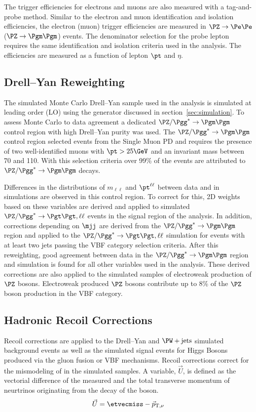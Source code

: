 The trigger efficiencies for electrons and muons are also measured with a tag-and-probe method.
Similar to the electron and muon identification and isolation efficiencies, the 
electron (muon) trigger efficiencies are measured in $\PZ\to\Pe\Pe$ ($\PZ\to\Pgm\Pgm$) events.
The denominator selection for the probe lepton requires the same identification and
isolation criteria used in the analysis. The efficiencies are measured as a function of
lepton $\pt$ and $\eta$.



\subsection{Drell--Yan Reweighting}
\label{sec:htt_dy_reweighting}
The simulated Monte Carlo Drell--Yan sample used in the analysis is simulated at leading order (LO)
using the \aMCATNLO generator discussed in section~\ref{sec:simulation}. To assess Monte Carlo to
data agreement a dedicated $\PZ/\Pgg^*\to\Pgm\Pgm$ control region with high Drell--Yan purity was used.
The $\PZ/\Pgg^*\to\Pgm\Pgm$ control region selected events from the Single Muon PD and requires the 
presence of two well-identified muons with $\pt > 25 \GeV$ and an invariant mass between 70 and 110\GeV.
With this selection criteria over 99\% of the events are attributed to $\PZ/\Pgg^*\to\Pgm\Pgm$ decays.

Differences in the distributions of $m_{\ell\ell}$ and $\pt^{\ell\ell}$ between data and 
in simulations are observed in this control region. To correct for this, 2D weights based on these variables 
are derived and applied to simulated $\PZ/\Pgg^*\to\Pgt\Pgt, \ell\ell$ events in the signal region of the analysis. 
In addition, corrections depending on $\mjj$ are derived from the $\PZ/\Pgg^*\to\Pgm\Pgm$ region and 
applied to the $\PZ/\Pgg^*\to\Pgt\Pgt, \ell\ell$ simulation for events with at least two jets passing the 
VBF category selection criteria. After this reweighting, good agreement between data in the 
$\PZ/\Pgg^*\to\Pgm\Pgm$ region and simulation is found for all other variables used in the analysis.
These derived corrections are also applied to the simulated samples of electroweak production of $\PZ$ 
bosons. Electroweak produced $\PZ$ bosons contribute up to 8\% of the $\PZ$ boson production in the VBF category.



\subsection{Hadronic Recoil Corrections}
Recoil corrections are applied to the Drell--Yan and $\PW+\text{jets}$ simulated background events 
as well as the simulated signal events for 
Higgs Bosons produced via the gluon fusion or VBF mechanisms. Recoil corrections correct for the
mismodeling of \etvecmiss in the simulated samples. A variable, $\vec{U}$, is defined as the 
vectorial difference of the measured \etvecmiss and the total transverse momentum of neurtrinos
originating from the decay of the boson.
\begin{equation}
\vec{U} = \etvecmiss - \vec{p}_{\text{T},\nu}
\end{equation}

